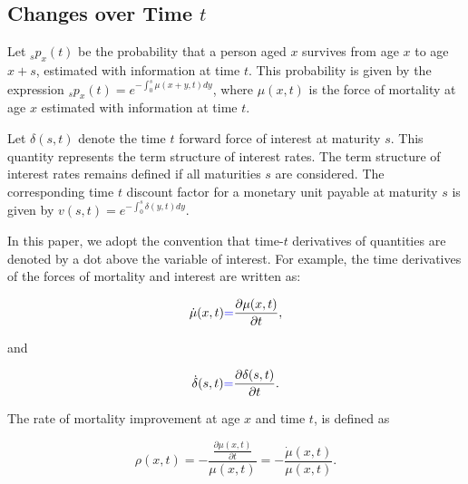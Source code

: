 \documentclass[12pt]{article}
\newcommand{\revision}[1]{\textcolor{blue}{#1}}
\begin{document}
\subsection{Changes over Time $t$}


Let \({}_s p_x(t) \) be the probability that a person aged \( x \) survives from age \( x \) to age \( x+s \), estimated with information at time $t$. This probability is given by the expression ${}_sp_x(t)=e^{-\int_{0}^{s}\mu(x+y,t)dy}$, where \(\mu(x,t)\) is the force of mortality at age \(x\) estimated with information at time $t$.

\color{blue}Let \( \delta(s,t) \) denote the time \( t \) forward force of interest at maturity \( s \). This quantity represents the term structure of interest rates. The term structure of interest rates remains defined if all maturities $s$ are considered.  The corresponding time \( t \) discount factor for a monetary unit payable at maturity \( s \) is given by ${v}(s,t)=e^{-\int_{0}^{s}\delta(y,t)dy}$. \color{black}

In this paper, we adopt the convention that time-$t$ derivatives of quantities are denoted by a dot above the variable of interest. For example, the time derivatives of the forces of mortality and interest are written as:


\begin{equation} \label{eq:mudot}
\dot{\mu}(x,t)\revision{=}\frac{\partial\mu(x,t)}{\partial t},
\end{equation}

and 

\begin{equation} \label{eq:deltadot}
\dot{\delta}(s,t)\revision{=}\frac{\partial\delta(s,t)}{\partial t}.
\end{equation}

The rate of mortality improvement at age \(x\) and time $t$, is defined as

\begin{equation} \label{eq:rho}
\rho(x,t)=-\frac{\frac{\partial \mu(x,t)}{\partial t}}{\mu(x,t)} = - \frac{\dot{\mu}(x,t)}{\mu(x,t)}.
\end{equation}
\end{document}
